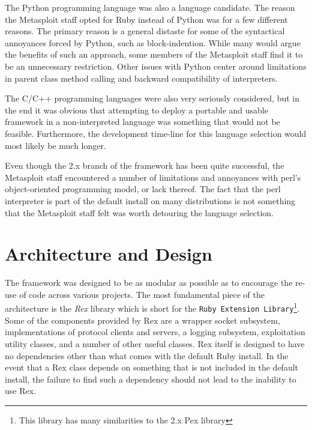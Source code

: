 \documentclass{report}
\begin{document}
\par
The Python programming language was also a language candidate. The
reason the Metasploit staff opted for Ruby instead of Python was for
a few different reasons.  The primary reason is a general distaste
for some of the syntactical annoyances forced by Python, such as
block-indention.  While many would argue the benefits of such an
approach, some members of the Metasploit staff find it to be an
unnecessary restriction.  Other issues with Python center around
limitations in parent class method calling and backward
compatibility of interpreters.

\par
The C/C++ programming languages were also very seriously considered,
but in the end it was obvious that attempting to deploy a portable
and usable framework in a non-interpreted language was something
that would not be feasible.  Furthermore, the development time-line
for this language selection would most likely be much longer.

\par
Even though the 2.x branch of the framework has been quite
successful, the Metasploit staff encountered a number of limitations
and annoyances with perl's object-oriented programming model, or
lack thereof.  The fact that the perl interpreter is part of the
default install on many distributions is not something that the
Metasploit staff felt was worth detouring the language selection.

\chapter{Architecture and Design}

\par
The framework was designed to be as modular as possible as to
encourage the re-use of code across various projects.  The most
fundamental piece of the architecture is the \textit{Rex} library
which is short for the \texttt{Ruby Extension Library}\footnote{This
library has many similarities to the 2.x Pex library}. Some of the
components provided by Rex are a wrapper socket subsystem,
implementations of protocol clients and servers, a logging
subsystem, exploitation utility classes, and a number of other
useful classes.  Rex itself is designed to have no dependencies
other than what comes with the default Ruby install. In the event
that a Rex class depends on something that is not included in the
default install, the failure to find such a dependency should not
lead to the inability to use Rex.
\end{document}
